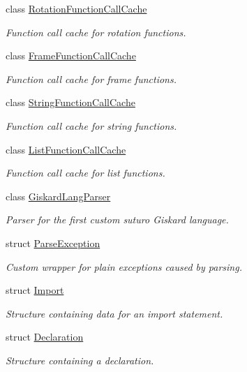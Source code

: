 \begin{DoxyCompactItemize}
class \hyperlink{classgiskard__suturo_1_1RotationFunctionCallCache}{Rotation\-Function\-Call\-Cache}
\begin{DoxyCompactList}\small\item\em Function call cache for rotation functions. \end{DoxyCompactList}\item 
class \hyperlink{classgiskard__suturo_1_1FrameFunctionCallCache}{Frame\-Function\-Call\-Cache}
\begin{DoxyCompactList}\small\item\em Function call cache for frame functions. \end{DoxyCompactList}\item 
class \hyperlink{classgiskard__suturo_1_1StringFunctionCallCache}{String\-Function\-Call\-Cache}
\begin{DoxyCompactList}\small\item\em Function call cache for string functions. \end{DoxyCompactList}\item 
class \hyperlink{classgiskard__suturo_1_1ListFunctionCallCache}{List\-Function\-Call\-Cache}
\begin{DoxyCompactList}\small\item\em Function call cache for list functions. \end{DoxyCompactList}\item 
class \hyperlink{classgiskard__suturo_1_1GiskardLangParser}{Giskard\-Lang\-Parser}
\begin{DoxyCompactList}\small\item\em Parser for the first custom suturo Giskard language. \end{DoxyCompactList}\item 
struct \hyperlink{structgiskard__suturo_1_1ParseException}{Parse\-Exception}
\begin{DoxyCompactList}\small\item\em Custom wrapper for plain exceptions caused by parsing. \end{DoxyCompactList}\item 
struct \hyperlink{structgiskard__suturo_1_1Import}{Import}
\begin{DoxyCompactList}\small\item\em Structure containing data for an import statement. \end{DoxyCompactList}\item 
struct \hyperlink{structgiskard__suturo_1_1Declaration}{Declaration}
\begin{DoxyCompactList}\small\item\em Structure containing a declaration. \end{DoxyCompactList}\item 

\end{DoxyCompactItemize}
